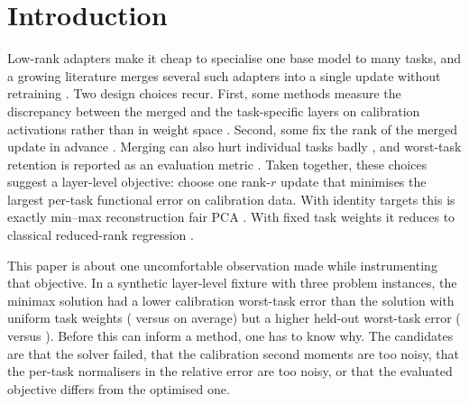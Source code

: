 \section{Introduction}
\label{sec:intro}

Low-rank adapters \citep{hu2021lora} make it cheap to specialise one base model to many tasks,
and a growing literature merges several such adapters into a single update without retraining
\citep{ilharco2022taskarith,yadav2023ties,jin2023regmean,stoica2024knots,he2026ctm}. Two design
choices recur. First, some methods measure the discrepancy between the merged and the task-specific
layers on calibration activations rather than in weight space \citep{jin2023regmean,nguyen2025regmeanpp}.
Second, some fix the rank of the merged update in advance \citep{he2026ctm,amballa2026budget}.
Merging can also hurt individual tasks badly \citep{cao2026collapse}, and worst-task retention is
reported as an evaluation metric \citep{he2026ctm}. Taken together, these choices suggest a
layer-level objective: choose one rank-$r$ update that minimises the largest per-task functional
error on calibration data. With identity targets this is exactly min--max reconstruction fair PCA
\citep{samadi2018fairpca,tantipongpipat2019multicriteria}. With fixed task weights it reduces to
classical reduced-rank regression \citep{izenman1975reduced}.

This paper is about one uncomfortable observation made while instrumenting that objective. In a
synthetic layer-level fixture with three problem instances, the minimax solution had a lower
calibration worst-task error than the solution with uniform task weights (\SOneMinimaxCalWorstMean{}
versus \SOneUniformCalWorstMean{} on average) but a higher held-out worst-task error
(\SOneMinimaxTestWorstMean{} versus \SOneUniformTestWorstMean). Before this can inform a method, one
has to know why. The candidates are that the solver failed, that the calibration second moments
are too noisy, that the per-task normalisers in the relative error are too noisy, or that the
evaluated objective differs from the optimised one.

